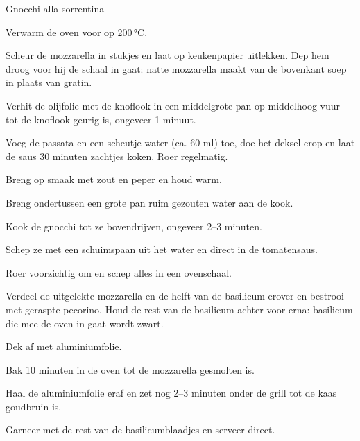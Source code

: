 \begin{recipe}{Gnocchi alla sorrentina}
\begin{steps}
  \item Verwarm de oven voor op 200\,°C.
  \item Scheur de mozzarella in stukjes en laat op keukenpapier uitlekken.
        Dep hem droog voor hij de schaal in gaat: natte mozzarella maakt van
        de bovenkant soep in plaats van gratin.
  \item Verhit de olijfolie met de knoflook in een middelgrote pan op
        middelhoog vuur tot de knoflook geurig is, ongeveer 1 minuut.
  \item Voeg de passata en een scheutje water (ca. 60 ml) toe, doe het
        deksel erop en laat de saus 30 minuten zachtjes koken. Roer
        regelmatig.
  \item Breng op smaak met zout en peper en houd warm.
  \item Breng ondertussen een grote pan ruim gezouten water aan de kook.
  \item Kook de gnocchi tot ze bovendrijven, ongeveer 2--3 minuten.
  \item Schep ze met een schuimspaan uit het water en direct in de
        tomatensaus.
  \item Roer voorzichtig om en schep alles in een ovenschaal.
  \item Verdeel de uitgelekte mozzarella en de helft van de basilicum erover
        en bestrooi met geraspte pecorino. Houd de rest van de basilicum
        achter voor erna: basilicum die mee de oven in gaat wordt zwart.
  \item Dek af met aluminiumfolie.
  \item Bak 10 minuten in de oven tot de mozzarella gesmolten is.
  \item Haal de aluminiumfolie eraf en zet nog 2--3 minuten onder de grill
        tot de kaas goudbruin is.
  \item Garneer met de rest van de basilicumblaadjes en serveer direct.
\end{steps}

\end{recipe}
